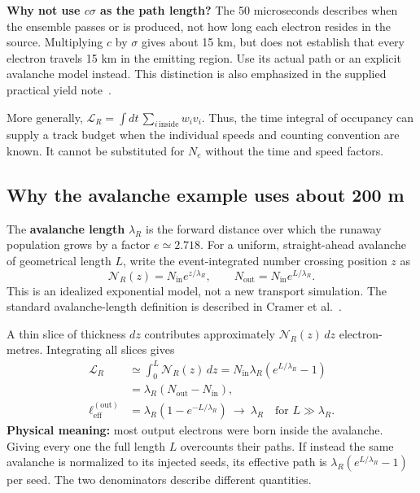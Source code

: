 \documentclass[11pt,a4paper]{article}
\begin{document}
\textbf{Why not use $c\sigma$ as the path length?} The 50 microseconds describes when the ensemble passes or is produced, not how long each electron resides in the source. Multiplying $c$ by $\sigma$ gives about 15 km, but does not establish that every electron travels 15 km in the emitting region. Use its actual path or an explicit avalanche model instead. This distinction is also emphasized in the supplied practical yield note~\cite{SuppliedYieldNote}.

More generally, $\mathcal L_R=\int dt\,\sum_{i\,\mathrm{inside}}w_i v_i$. Thus, the time integral of occupancy can supply a track budget when the individual speeds and counting convention are known. It cannot be substituted for $N_e$ without the time and speed factors.

\clearpage
\subsection{Why the avalanche example uses about 200 m}
\label{sec:avlength}
The \textbf{avalanche length} $\lambda_R$ is the forward distance over which the runaway population grows by a factor $e\simeq2.718$. For a uniform, straight-ahead avalanche of geometrical length $L$, write the event-integrated number crossing position $z$ as
\begin{equation}
 \mathcal N_R(z)=N_{\mathrm{in}}e^{z/\lambda_R},\qquad
 N_{\mathrm{out}}=N_{\mathrm{in}}e^{L/\lambda_R}.
 \label{eq:avpopulation}
\end{equation}
This is an idealized exponential model, not a new transport simulation. The standard avalanche-length definition is described in Cramer et al.~\cite{Cramer2016}.

A thin slice of thickness $dz$ contributes approximately $\mathcal N_R(z)\,dz$ electron-metres. Integrating all slices gives
\begin{align}
 \mathcal L_R&\simeq\int_0^L\mathcal N_R(z)\,dz
 =N_{\mathrm{in}}\lambda_R\left(e^{L/\lambda_R}-1\right)\nonumber\\
 &=\lambda_R(N_{\mathrm{out}}-N_{\mathrm{in}}),\\
 \ell_{\mathrm{eff}}^{(\mathrm{out})}
 &=\lambda_R\left(1-e^{-L/\lambda_R}\right)
 \ \longrightarrow\ \lambda_R\quad\text{for }L\gg\lambda_R.
 \label{eq:effectiveavlength}
\end{align}
\textbf{Physical meaning:} most output electrons were born inside the avalanche. Giving every one the full length $L$ overcounts their paths. If instead the same avalanche is normalized to its injected seeds, its effective path is $\lambda_R(e^{L/\lambda_R}-1)$ per seed. The two denominators describe different quantities.
\end{document}
